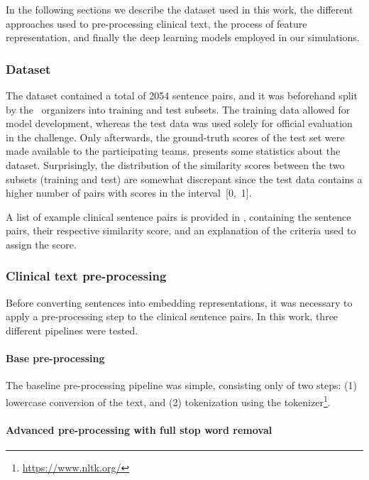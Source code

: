 In the following sections we describe the dataset used in this work, the different approaches used to pre-processing clinical text, the process of feature representation, and finally the deep learning models employed in our simulations.


\subsubsection{Dataset}

The dataset contained a total of 2054 sentence pairs, and it was beforehand split by the ~organizers into training and test subsets.
The training data allowed for model development, whereas the test data was used solely for official evaluation in the challenge.
Only afterwards, the ground-truth scores of the test set were made available to the participating teams.
 presents some statistics about the dataset.
Surprisingly, the distribution of the similarity scores between the two subsets (training and test) are somewhat discrepant since the test data contains a higher number of pairs with scores in the interval~[0,~1].

A list of example clinical sentence pairs is provided in , containing the sentence pairs, their respective similarity score, and an explanation of the criteria used to assign the score.





\subsubsection{Clinical text pre-processing}

Before converting sentences into embedding representations, it was necessary to apply a pre-processing step to the clinical sentence pairs.
In this work, three different pipelines were tested.


\paragraph{Base pre-processing}

The baseline pre-processing pipeline was simple, consisting only of two steps: (1) lowercase conversion of the text, and (2) tokenization using the  tokenizer\footnote{\url{https://www.nltk.org/}}.


\paragraph{Advanced pre-processing with full stop word removal}

